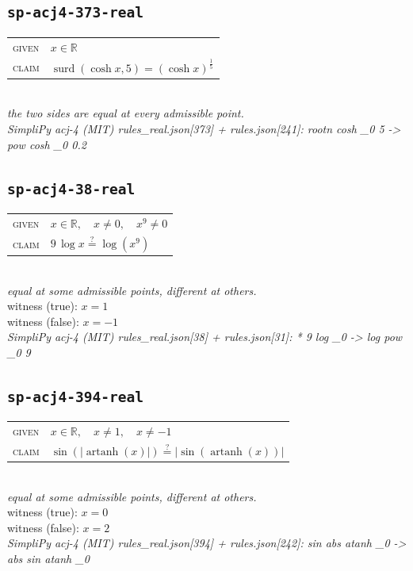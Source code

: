 \documentclass[11pt]{article}
\begin{document}
\subsection*{\texttt{sp-acj4-373-real}}
\begin{tabular}{@{}l@{\quad}l@{}}
\textsc{given} & $x \in \mathbb{R}$ \\[4pt]
\textsc{claim} & $\displaystyle \operatorname{surd}\left(\cosh x, 5\right) = \left(\cosh x\right)^{\frac{1}{5}}$ \\
\end{tabular}\\[2pt]
{\small\emph{the two sides are equal at every admissible point.}}\\
\emph{SimpliPy acj-4 (MIT) rules\_real.json[373] + rules.json[241]: rootn cosh \_0 5  ->  pow cosh \_0 0.2}\\

\subsection*{\texttt{sp-acj4-38-real}}
\begin{tabular}{@{}l@{\quad}l@{}}
\textsc{given} & $x \in \mathbb{R},\quad x \neq 0,\quad x^{9} \neq 0$ \\[4pt]
\textsc{claim} & $\displaystyle 9 \, \log x \overset{?}{=} \log\left(x^{9}\right)$ \\
\end{tabular}\\[2pt]
{\small\emph{equal at some admissible points, different at others.}}\\
{\footnotesize\color{gray}witness (true): $x = 1$}\\
{\footnotesize\color{gray}witness (false): $x = -1$}\\
\emph{SimpliPy acj-4 (MIT) rules\_real.json[38] + rules.json[31]: * 9 log \_0  ->  log pow \_0 9}\\

\subsection*{\texttt{sp-acj4-394-real}}
\begin{tabular}{@{}l@{\quad}l@{}}
\textsc{given} & $x \in \mathbb{R},\quad x \neq 1,\quad x \neq -1$ \\[4pt]
\textsc{claim} & $\displaystyle \sin\left(\left|\operatorname{artanh}\left(x\right)\right|\right) \overset{?}{=} \left|\sin\left(\operatorname{artanh}\left(x\right)\right)\right|$ \\
\end{tabular}\\[2pt]
{\small\emph{equal at some admissible points, different at others.}}\\
{\footnotesize\color{gray}witness (true): $x = 0$}\\
{\footnotesize\color{gray}witness (false): $x = 2$}\\
\emph{SimpliPy acj-4 (MIT) rules\_real.json[394] + rules.json[242]: sin abs atanh \_0  ->  abs sin atanh \_0}\\
\end{document}
